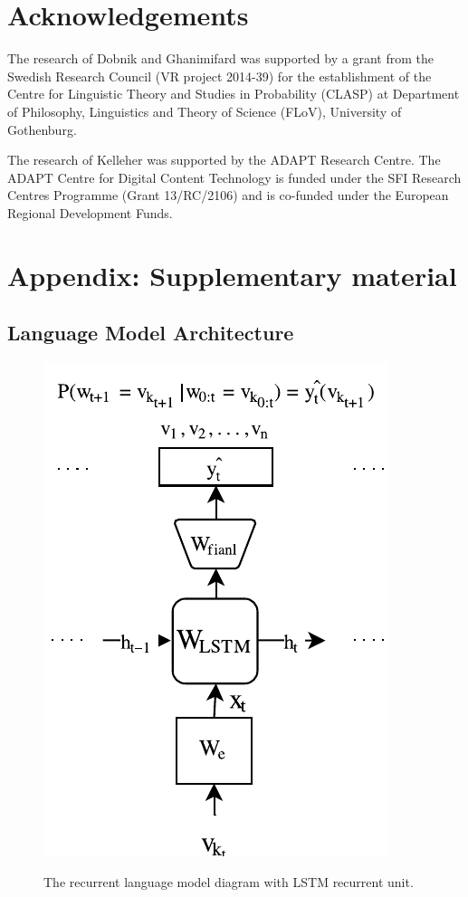 \section*{Acknowledgements}

The research of Dobnik and Ghanimifard was supported by a grant from the Swedish Research Council (VR project 2014-39) for the establishment of the Centre for Linguistic Theory and Studies in Probability (CLASP) at Department of Philosophy, Linguistics and Theory of Science (FLoV), University of Gothenburg.

The research of Kelleher was supported by the ADAPT Research Centre. The ADAPT Centre for Digital Content Technology is funded under the SFI Research Centres Programme (Grant 13/RC/2106) and is co-funded under the European Regional Development Funds.


\section{Appendix: Supplementary material}

\subsection*{Language Model Architecture}\label{splu2018:sec:lm}

\begin{figure}[ht!]
  \begin{center}
  \includegraphics[width=0.35\linewidth]{studies/splu2018/figures/lm_diagram.pdf} \\
  \caption{The recurrent language model diagram with LSTM recurrent unit.}
  \label{splu2018:fig:lm-diagram}
  \end{center}
\end{figure}

